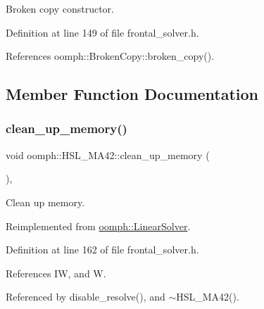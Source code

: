 Broken copy constructor. 



Definition at line 149 of file frontal\+\_\+solver.\+h.



References oomph\+::\+Broken\+Copy\+::broken\+\_\+copy().



\subsection{Member Function Documentation}
\mbox{\label{classoomph_1_1HSL__MA42_a81487397ec92afb883f0a95beb99aff0}} 
\subsubsection{\texorpdfstring{clean\+\_\+up\+\_\+memory()}{clean\_up\_memory()}}
{\footnotesize\ttfamily void oomph\+::\+H\+S\+L\+\_\+\+M\+A42\+::clean\+\_\+up\+\_\+memory (\begin{DoxyParamCaption}{ }\end{DoxyParamCaption})\hspace{0.3cm}{\ttfamily [inline]}, {\ttfamily [virtual]}}



Clean up memory. 



Reimplemented from \hyperlink{classoomph_1_1LinearSolver_a9d66f3262e80ca06a365f98216afd85f}{oomph\+::\+Linear\+Solver}.



Definition at line 162 of file frontal\+\_\+solver.\+h.



References IW, and W.



Referenced by disable\+\_\+resolve(), and $\sim$\+H\+S\+L\+\_\+\+M\+A42().

\mbox{\label{classoomph_1_1HSL__MA42_a3a097433f26487e9d741b999beb03681}} 

